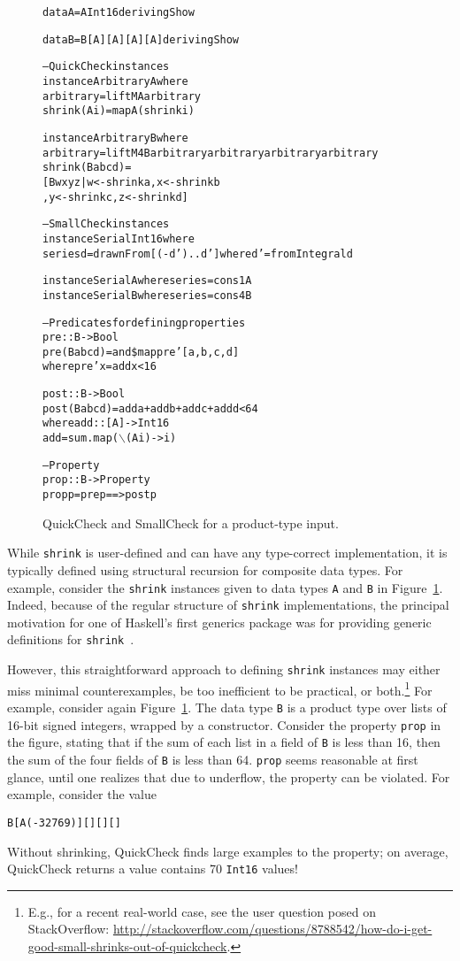 \documentclass[9pt]{sigplanconf}
\newenvironment{code}{\begin{alltt}\scriptsize}{\end{alltt}}
\newcommand{\ttp}[1]{\texttt{#1}}
\begin{document}
\begin{figure}[ht]
\begin{code}
data A = A Int16 deriving Show

data B = B [A] [A] [A] [A] deriving Show

-- QuickCheck instances
instance Arbitrary A where
  arbitrary    = liftM A arbitrary
  shrink (A i) = map A (shrink i)

instance Arbitrary B where
  arbitrary = liftM4 B arbitrary arbitrary arbitrary arbitrary
  shrink (B a b c d) = 
    [ B w x y z | w <- shrink a, x <- shrink b
                , y <- shrink c, z <- shrink d ]

-- SmallCheck instances
instance Serial Int16 where
  series d = drawnFrom [(-d')..d'] where d' = fromIntegral d

instance Serial A where series = cons1 A 
instance Serial B where series = cons4 B

-- Predicates for defining properties
pre :: B -> Bool
pre (B a b c d) = and \$ map pre' [a, b, c, d]
  where pre' x = add x < 16
  
post :: B -> Bool
post (B a b c d) = add a + add b + add c + add d < 64
  where add :: [A] -> Int16
        add = sum . map (\(\backslash\)(A i) -> i)

-- Property
prop :: B -> Property
prop p = pre p ==> post p
\end{code}
  \caption{QuickCheck and SmallCheck for a product-type input.}
  \label{fig:initial}
\end{figure}

While \ttp{shrink} is user-defined and can have any type-correct implementation,
it is typically defined using structural recursion for composite data types.
For example, consider the \ttp{shrink} instances given to data types \ttp{A} and
\ttp{B} in Figure~\ref{fig:initial}.  Indeed, because of the regular structure
of \ttp{shrink} implementations, the principal motivation for one
of Haskell's first generics package was for providing generic definitions for
\ttp{shrink}~\cite{syb}.

However, this straightforward approach to defining \ttp{shrink} instances may
either miss minimal counterexamples, be too inefficient to be practical, or
both.\footnote{E.g., for a recent real-world case, see the user question posed on StackOverflow:
  \url{http://stackoverflow.com/questions/8788542/how-do-i-get-good-small-shrinks-out-of-quickcheck}.}
For example, consider again Figure~\ref{fig:initial}.  The data type \ttp{B} is
a product type over lists of 16-bit signed integers, wrapped by a constructor.
Consider the property \ttp{prop} in the figure, stating that if the sum of each
list in a field of \ttp{B} is less than 16, then the sum of the four fields of
\ttp{B} is less than 64.  \ttp{prop} seems reasonable at first glance, until
one realizes that due to underflow, the property can be violated.  For example,
consider the value
%
\begin{code}
B [A (-32769)] [] [] []
\end{code}
%
\noindent
Without shrinking, QuickCheck finds large examples to the property; on average,
QuickCheck returns a value contains 70 \ttp{Int16} values!
\end{document}
